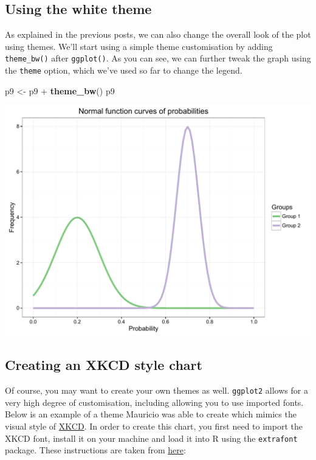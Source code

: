 \documentclass[]{article}
\newenvironment{Shaded}{\begin{snugshade}}{\end{snugshade}}
\newcommand{\KeywordTok}[1]{\textcolor[rgb]{0.13,0.29,0.53}{\textbf{{#1}}}}
\newcommand{\StringTok}[1]{\textcolor[rgb]{0.31,0.60,0.02}{{#1}}}
\newcommand{\NormalTok}[1]{{#1}}
\begin{document}
\subsection{Using the white theme}\label{using-the-white-theme-8}

As explained in the previous posts, we can also change the overall look
of the plot using themes. We'll start using a simple theme customisation
by adding \texttt{theme\_bw()} after \texttt{ggplot()}. As you can see,
we can further tweak the graph using the \texttt{theme} option, which
we've used so far to change the legend.

\begin{Shaded}
\begin{Highlighting}[]
\NormalTok{p9 <-}\StringTok{ }\NormalTok{p9 +}\StringTok{ }\KeywordTok{theme_bw}\NormalTok{()}
\NormalTok{p9}
\end{Highlighting}
\end{Shaded}

\begin{center}\includegraphics{0_all_posts_pdf/function_13-1} \end{center}

\subsection{Creating an XKCD style
chart}\label{creating-an-xkcd-style-chart-8}

Of course, you may want to create your own themes as well.
\texttt{ggplot2} allows for a very high degree of customisation,
including allowing you to use imported fonts. Below is an example of a
theme Mauricio was able to create which mimics the visual style of
\href{http://xkcd.com/}{XKCD}. In order to create this chart, you first
need to import the XKCD font, install it on your machine and load it
into R using the \texttt{extrafont} package. These instructions are
taken from
\href{https://www.google.com.au/url?sa=t\&rct=j\&q=\&esrc=s\&source=web\&cd=1\&ved=0ahUKEwiWzafchdPJAhVBpJQKHe_LDT8QFggbMAA\&url=https\%3A\%2F\%2Fcran.r-project.org\%2Fweb\%2Fpackages\%2Fxkcd\%2Fvignettes\%2Fxkcd-intro.pdf\&usg=AFQjCNE-KciGY14e-Q1buYIVmTFC0ht__Q\&sig2=DZUwkvIHwfNWtTtkcz94jg}{here}:
\end{document}
